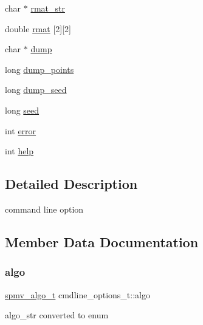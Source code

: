 \begin{DoxyCompactItemize}
\item 
char $\ast$ \hyperlink{structcmdline__options__t_a4ae2cfd5fda7a25e302fff37c1201f93}{rmat\+\_\+str}
\item 
double \hyperlink{structcmdline__options__t_a60e05c62d3fd439c03fd26d9f8078a4b}{rmat} \mbox{[}2\mbox{]}\mbox{[}2\mbox{]}
\item 
char $\ast$ \hyperlink{structcmdline__options__t_aa4b96337328846dd1d2c0ca8eee7933f}{dump}
\item 
long \hyperlink{structcmdline__options__t_a8034ee34658dd09267c9bdbd53050c9a}{dump\+\_\+points}
\item 
long \hyperlink{structcmdline__options__t_afa92e5953f8c49714b09ccdd12a1f8a7}{dump\+\_\+seed}
\item 
long \hyperlink{structcmdline__options__t_a065412d7cdc54cdae630389c3fda266e}{seed}
\item 
int \hyperlink{structcmdline__options__t_a25f9087b240da0b93a4295fa5f173c88}{error}
\item 
int \hyperlink{structcmdline__options__t_ab02741e43bb19900e87caaec3a8dd794}{help}
\end{DoxyCompactItemize}


\subsection{Detailed Description}
command line option 

\subsection{Member Data Documentation}
\mbox{\label{structcmdline__options__t_afddf83f65e6e4a14761d84a5e876e6ac}} 
\subsubsection{\texorpdfstring{algo}{algo}}
{\footnotesize\ttfamily \hyperlink{spmv_8cc_ad2cf0493af54bf76c5be68b4634fcab7}{spmv\+\_\+algo\+\_\+t} cmdline\+\_\+options\+\_\+t\+::algo}

algo\+\_\+str converted to enum \mbox{\label{structcmdline__options__t_ae8ab407cdc87a30c1b4cdf6b424c8370}} 
